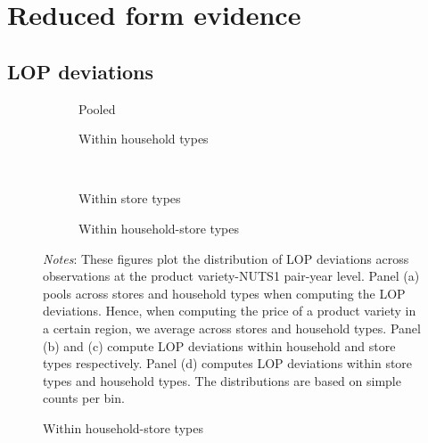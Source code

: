 \section{Reduced form evidence}
\subsection{LOP deviations}
 \begin{figure}[H]
    \centering
    \caption{LOP deviations - Unweighted}
    \label{fig: app_redform_dp_unw}
    \begin{subfigure}[t]{.49\textwidth}
         \centering
         \caption{Pooled}
         \label{fig: app_redform_dp_unw_p}
         \scalebox{0.45}{}
     \end{subfigure}
     \begin{subfigure}[t]{.49\textwidth}
         \centering
         \caption{Within household types}
         \label{fig: app_redform_dp_unw_h}
         \scalebox{0.45}{}
     \end{subfigure}\\
     \begin{subfigure}[t]{.49\textwidth}
         \centering
         \caption{Within store types}
         \label{fig: app_redform_dp_unw_s}
         \scalebox{0.45}{}
     \end{subfigure}
     \begin{subfigure}[t]{.49\textwidth}
         \centering
         \caption{Within household-store types}
         \label{fig: app_redform_dp_unw_hs}
         \scalebox{0.45}{}
     \end{subfigure}
     \parbox{\textwidth}{
        \begin{spacing}{1} 
            {\footnotesize 
            \textit{Notes}: These figures plot the distribution of LOP deviations across observations at the product variety-NUTS1 pair-year level. Panel (a) pools across stores and household types when computing the LOP deviations. Hence, when computing the price of a product variety in a certain region, we average across stores and household types. Panel (b) and (c) compute LOP deviations within household and store types respectively. Panel (d) computes LOP deviations within store types and household types. The distributions are based on simple counts per bin.}
        \end{spacing}}
 \end{figure} 

